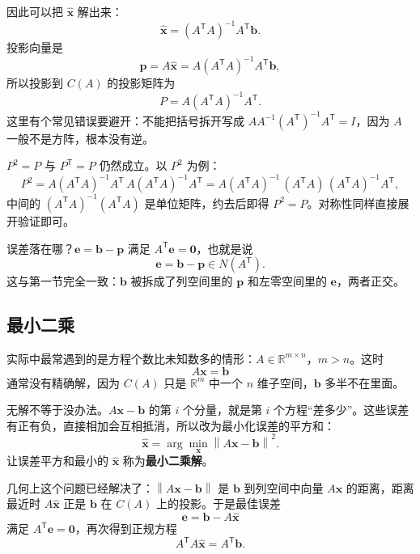 \documentclass[UTF8,a4paper,12pt]{ctexart}
\numberwithin{equation}{section}
\newcommand{\R}{\mathbb{R}}
\newcommand{\norm}[1]{\left\lVert #1 \right\rVert}
\newcommand{\trans}{^{\mathsf T}}
\begin{document}
	因此可以把 $\hat{\bm{x}}$ 解出来：
	\begin{equation}\label{eq:6.47}
	\boxed{\hat{\bm{x}}=(A\trans A)^{-1}A\trans\bm{b}.}
	\end{equation}
	投影向量是
	\begin{equation}\label{eq:6.48}
	\bm{p}=A\hat{\bm{x}}
	=A(A\trans A)^{-1}A\trans\bm{b},
	\end{equation}
	所以投影到 $C(A)$ 的投影矩阵为
	\begin{equation}\label{eq:6.49}
	\boxed{P=A(A\trans A)^{-1}A\trans.}
	\end{equation}
	这里有个常见错误要避开：不能把括号拆开写成 $AA^{-1}(A\trans)^{-1}A\trans=I$，因为 $A$ 一般不是方阵，根本没有逆。

	$P^2=P$ 与 $P\trans=P$ 仍然成立。以 $P^2$ 为例：
	\begin{equation}\label{eq:6.50}
	P^2
	=A(A\trans A)^{-1}A\trans\,A(A\trans A)^{-1}A\trans
	=A(A\trans A)^{-1}\,(A\trans A)\,(A\trans A)^{-1}A\trans,
	\end{equation}
	中间的 $(A\trans A)^{-1}(A\trans A)$ 是单位矩阵，约去后即得 $P^2=P$。对称性同样直接展开验证即可。

	误差落在哪？$\bm{e}=\bm{b}-\bm{p}$ 满足 $A\trans\bm{e}=\bm{0}$，也就是说
	\begin{equation}\label{eq:6.51}
	\bm{e}=\bm{b}-\bm{p}\in N(A\trans).
	\end{equation}
	这与第一节完全一致：$\bm{b}$ 被拆成了列空间里的 $\bm{p}$ 和左零空间里的 $\bm{e}$，两者正交。

	\subsection{最小二乘}

	实际中最常遇到的是方程个数比未知数多的情形：$A\in\R^{m\times n}$，$m>n$。这时
	\begin{equation}\label{eq:6.52}
	A\bm{x}=\bm{b}
	\end{equation}
	通常没有精确解，因为 $C(A)$ 只是 $\R^m$ 中一个 $n$ 维子空间，$\bm{b}$ 多半不在里面。

	无解不等于没办法。$A\bm{x}-\bm{b}$ 的第 $i$ 个分量，就是第 $i$ 个方程“差多少”。这些误差有正有负，直接相加会互相抵消，所以改为最小化误差的平方和：
	\begin{equation}\label{eq:6.53}
	\hat{\bm{x}}
	=
	\arg\min_{\bm{x}}
	\norm{A\bm{x}-\bm{b}}^2.
	\end{equation}
	让误差平方和最小的 $\hat{\bm{x}}$ 称为\textbf{最小二乘解}。

	几何上这个问题已经解决了：$\norm{A\bm{x}-\bm{b}}$ 是 $\bm{b}$ 到列空间中向量 $A\bm{x}$ 的距离，距离最近时 $A\hat{\bm{x}}$ 正是 $\bm{b}$ 在 $C(A)$ 上的投影。于是最佳误差
	\begin{equation}\label{eq:6.54}
	\bm{e}=\bm{b}-A\hat{\bm{x}}
	\end{equation}
	满足 $A\trans\bm{e}=\bm{0}$，再次得到正规方程
	\begin{equation}\label{eq:6.55}
	A\trans A\hat{\bm{x}}=A\trans\bm{b}.
	\end{equation}
\end{document}
